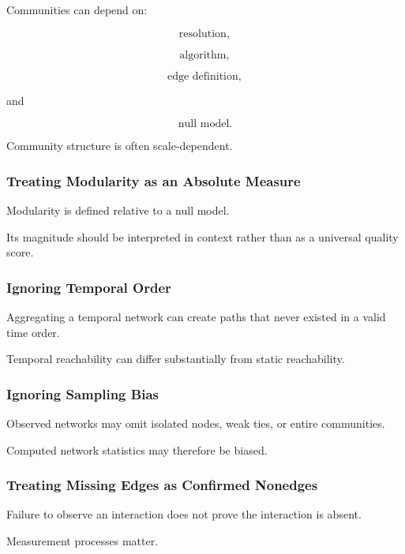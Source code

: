 Communities can depend on:

\[
\boxed{
\text{resolution},
}
\]

\[
\boxed{
\text{algorithm},
}
\]

\[
\boxed{
\text{edge definition},
}
\]

and

\[
\boxed{
\text{null model}.
}
\]

Community structure is often scale-dependent.

\subsubsection{Treating Modularity as an Absolute Measure}

Modularity is defined relative to a null model.

Its magnitude should be interpreted in context rather than as a universal
quality score.

\subsubsection{Ignoring Temporal Order}

Aggregating a temporal network can create paths that never existed in a valid
time order.

Temporal reachability can differ substantially from static reachability.

\subsubsection{Ignoring Sampling Bias}

Observed networks may omit isolated nodes, weak ties, or entire communities.

Computed network statistics may therefore be biased.

\subsubsection{Treating Missing Edges as Confirmed Nonedges}

Failure to observe an interaction does not prove the interaction is absent.

Measurement processes matter.

